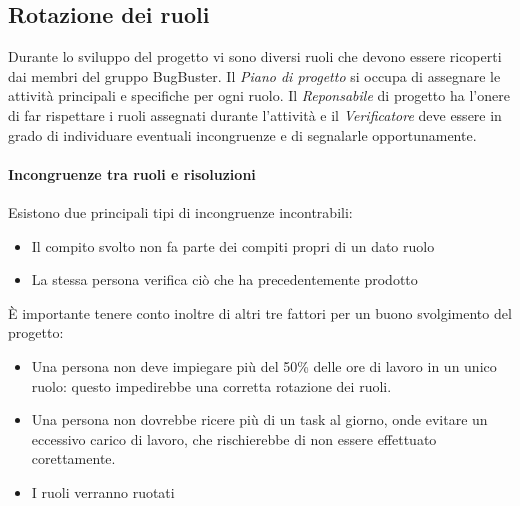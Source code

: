 \subsection{Rotazione dei ruoli}

Durante lo sviluppo del progetto vi sono diversi ruoli che devono essere ricoperti dai membri del gruppo BugBuster. Il \textit{Piano di progetto} si occupa di assegnare le attività principali e specifiche per ogni ruolo. Il \textit{Reponsabile} di progetto ha l'onere di far rispettare i ruoli assegnati durante l'attività e il \textit{Verificatore} deve essere in grado di individuare eventuali incongruenze e di segnalarle opportunamente.
\paragraph*{Incongruenze tra ruoli e risoluzioni}
Esistono due principali tipi di incongruenze incontrabili:
\begin{itemize}

\item Il compito svolto non fa parte dei compiti propri di un dato ruolo
\item La stessa persona verifica ciò che ha precedentemente prodotto
\end{itemize}

È importante tenere conto inoltre di altri tre fattori per un buono svolgimento del progetto:
\begin{itemize}

\item Una persona non deve impiegare più del 50\% delle ore di lavoro in un unico ruolo: questo impedirebbe una corretta rotazione dei ruoli.
\item Una persona non dovrebbe ricere più di un task al giorno, onde evitare un eccessivo carico di lavoro, che rischierebbe di non essere effettuato corettamente.
\item I ruoli verranno ruotati %

\end{itemize}
